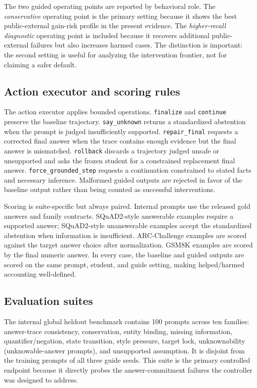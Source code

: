 \documentclass[11pt]{article}
\begin{document}
The two guided operating points are reported by behavioral role. The \emph{conservative} operating point is the primary setting because it shows the best public-external gain-risk profile in the present evidence. The \emph{higher-recall diagnostic} operating point is included because it recovers additional public-external failures but also increases harmed cases. The distinction is important: the second setting is useful for analyzing the intervention frontier, not for claiming a safer default.

\subsection{Action executor and scoring rules}
The action executor applies bounded operations. \texttt{finalize} and \texttt{continue} preserve the baseline trajectory. \texttt{say\_unknown} returns a standardized abstention when the prompt is judged insufficiently supported. \texttt{repair\_final} requests a corrected final answer when the trace contains enough evidence but the final answer is mismatched. \texttt{rollback} discards a trajectory judged unsafe or unsupported and asks the frozen student for a constrained replacement final answer. \texttt{force\_grounded\_step} requests a continuation constrained to stated facts and necessary inference. Malformed guided outputs are rejected in favor of the baseline output rather than being counted as successful interventions.

Scoring is suite-specific but always paired. Internal prompts use the released gold answers and family contracts. SQuAD2-style answerable examples require a supported answer; SQuAD2-style unanswerable examples accept the standardized abstention when information is insufficient. ARC-Challenge examples are scored against the target answer choice after normalization. GSM8K examples are scored by the final numeric answer. In every case, the baseline and guided outputs are scored on the same prompt, student, and guide setting, making helped/harmed accounting well-defined.

\subsection{Evaluation suites}
The internal global heldout benchmark contains 100 prompts across ten families: answer-trace consistency, conservation, entity binding, missing information, quantifier/negation, state transition, style pressure, target lock, unknownability (unknowable-answer prompts), and unsupported assumption. It is disjoint from the training prompts of all three guide seeds. This suite is the primary controlled endpoint because it directly probes the answer-commitment failures the controller was designed to address.
\end{document}
